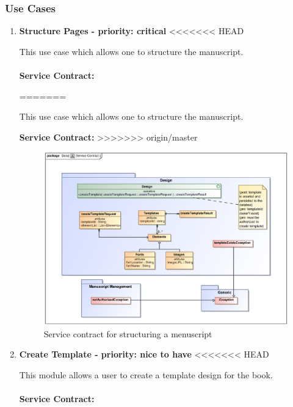 \subsubsection{Use Cases}
\begin{enumerate}
\item \textbf{Structure Pages - priority: critical}
<<<<<<< HEAD
\par{This use case which allows one to structure the  manuscript.}\\
\\
\textbf{Service Contract:} 

=======
\par{This use case which allows one to structure the  manuscript.}
\par{\textbf{Service Contract:}
}
>>>>>>> origin/master
\begin{figure}[h]
\includegraphics[scale=0.8,width=400px]{epsImages/Design/createTemplateServiceContract.eps}
\centering
\caption{Service contract for structuring a menuscript}
\end{figure}

\newpage
\item \textbf{Create Template - priority: nice to have}
<<<<<<< HEAD
\par{This module allows a user to create a template design for the book.}\\
\\
\textbf{Service Contract:} 


\end{enumerate}
